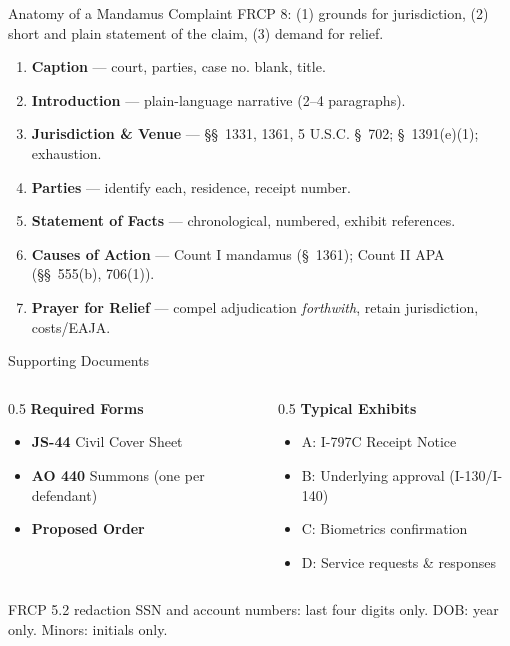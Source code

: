 \documentclass[aspectratio=169,11pt]{beamer}
\begin{document}
	\begin{frame}{Anatomy of a Mandamus Complaint}
		\small
		FRCP 8: (1) grounds for jurisdiction, (2) short and plain statement of the claim, (3) demand for relief.
		\begin{enumerate}
			\item \textbf{Caption} --- court, parties, case no. blank, title.
			\item \textbf{Introduction} --- plain-language narrative (2--4 paragraphs).
			\item \textbf{Jurisdiction \& Venue} --- \S\S~1331, 1361, 5 U.S.C. \S~702; \S~1391(e)(1); exhaustion.
			\item \textbf{Parties} --- identify each, residence, receipt number.
			\item \textbf{Statement of Facts} --- chronological, numbered, exhibit references.
			\item \textbf{Causes of Action} --- Count I mandamus (\S~1361); Count II APA (\S\S~555(b), 706(1)).
			\item \textbf{Prayer for Relief} --- compel adjudication \emph{forthwith}, retain jurisdiction, costs/EAJA.
		\end{enumerate}
	\end{frame}
	
	\begin{frame}{Supporting Documents}
		\small
		\begin{columns}[T]
			\begin{column}{0.5\textwidth}
				\textbf{Required Forms}
				\begin{itemize}
					\item \textbf{JS-44} Civil Cover Sheet
					\item \textbf{AO 440} Summons (one per defendant)
					\item \textbf{Proposed Order}
				\end{itemize}
			\end{column}
			\begin{column}{0.5\textwidth}
				\textbf{Typical Exhibits}
				\begin{itemize}
					\item A: I-797C Receipt Notice
					\item B: Underlying approval (I-130/I-140)
					\item C: Biometrics confirmation
					\item D: Service requests \& responses
				\end{itemize}
			\end{column}
		\end{columns}
		\vspace{1em}
		\begin{alertblock}{FRCP 5.2 redaction}
			\small SSN and account numbers: last four digits only. DOB: year only. Minors: initials only.
		\end{alertblock}
	\end{frame}
	
\end{document}
